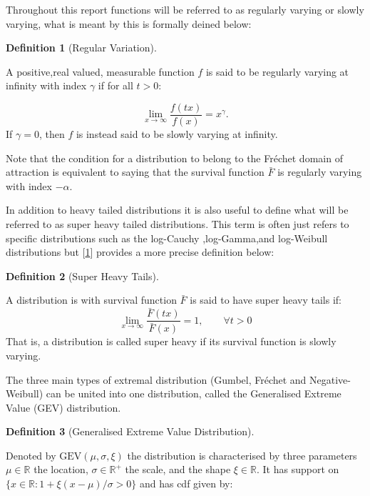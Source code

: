 \documentclass[
  10pt,
  a4paper,
]{scrreprt}
\theoremstyle{plain}
\theoremstyle{plain}
\theoremstyle{definition}
\newtheorem{definition}{Definition}[section]
\theoremstyle{plain}
\theoremstyle{remark}
\begin{document}
{Throughout this report functions will be referred to as regularly
varying or slowly varying, what is meant by this is formally deined
below:

\begin{definition}[Regular
Variation]\protect\hypertarget{def-rv}{}\label{def-rv}

A positive,real valued, measurable function \(f\) is said to be
regularly varying at infinity with index \(\gamma\) if for all \(t>0\):

\[
\lim_{x\rightarrow\infty}\displaystyle\frac{f(tx)}{f(x)} = x^{\gamma}.
\] If \(\gamma =0\), then \(f\) is instead said to be slowly varying at
infinity.

\end{definition}

Note that the condition for a distribution to belong to the Fréchet
domain of attraction is equivalent to saying that the survival function
\(\bar F\) is regularly varying with index \(-\alpha\).

In addition to heavy tailed distributions it is also useful to define
what will be referred to as super heavy tailed distributions. This term
is often just refers to specific distributions such as the log-Cauchy
,log-Gamma,and log-Weibull distributions but
{[}\protect\hyperlink{ref-fmh09}{1}{]} provides a more precise
definition below:

\begin{definition}[Super Heavy
Tails]\protect\hypertarget{def-sup}{}\label{def-sup}

A distribution is with survival function \(\bar F\) is said to have
super heavy tails if: \[
\lim_{x\rightarrow\infty}\displaystyle\frac{\bar F(tx)}{\bar F (x)} = 1,\qquad \forall t>0
\] That is, a distribution is called super heavy if its survival
function is slowly varying.

\end{definition}

The three main types of extremal distribution (Gumbel, Fréchet and
Negative-Weibull) can be united into one distribution, called the
Generalised Extreme Value (GEV) distribution.

\begin{definition}[Generalised Extreme Value
Distribution]\protect\hypertarget{def-gev}{}\label{def-gev}

Denoted by \(\text{GEV}(\mu,\sigma,\xi)\) the distribution is
characterised by three parameters \(\mu \in \mathbb R\) the location,
\(\sigma\in \mathbb R^+\) the scale, and the shape \(\xi\in \mathbb R\).
It has support on \(\{x\in \mathbb R:1+\xi(x-\mu)/\sigma > 0\}\) and has
cdf given by:


\end{definition}}
\end{document}
